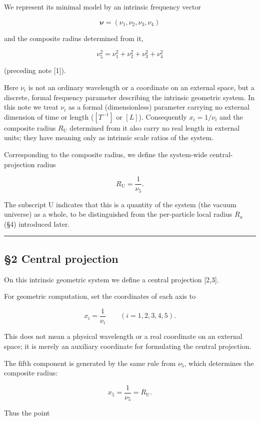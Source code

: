 \documentclass[
]{article}
\begin{document}
We represent its minimal model by an intrinsic frequency vector

\[\boldsymbol{\nu}=(\nu_1,\nu_2,\nu_3,\nu_4)\]

and the composite radius determined from it,

\[\nu_5^2=\nu_1^2+\nu_2^2+\nu_3^2+\nu_4^2\]

(preceding note {[}1{]}).

Here \(\nu_i\) is not an ordinary wavelength or a coordinate on an
external space, but a discrete, formal frequency parameter describing
the intrinsic geometric system. In this note we treat \(\nu_i\) as a
formal (dimensionless) parameter carrying no external dimension of time
or length (\([T^{-1}]\) or \([L]\)). Consequently \(x_i=1/\nu_i\) and
the composite radius \(R_{\mathrm U}\) determined from it also carry no
real length in external units; they have meaning only as intrinsic scale
ratios of the system.

Corresponding to the composite radius, we define the system-wide
central-projection radius

\[R_{\mathrm U}=\frac{1}{\nu_5}.\]

The subscript U indicates that this is a quantity of the system (the
vacuum universe) as a whole, to be distinguished from the per-particle
local radius \(R_a\) (§4) introduced later.

\begin{center}\rule{0.5\linewidth}{0.5pt}\end{center}

\subsection{§2 Central projection}\label{central-projection}

On this intrinsic geometric system we define a central projection
{[}2,3{]}.

For geometric computation, set the coordinates of each axis to

\[x_i=\frac{1}{\nu_i}\qquad(i=1,2,3,4,5).\]

This does not mean a physical wavelength or a real coordinate on an
external space; it is merely an auxiliary coordinate for formulating the
central projection.

The fifth component is generated by the same rule from \(\nu_5\), which
determines the composite radius:

\[x_5=\frac{1}{\nu_5}=R_{\mathrm U}.\]

Thus the point
\end{document}
